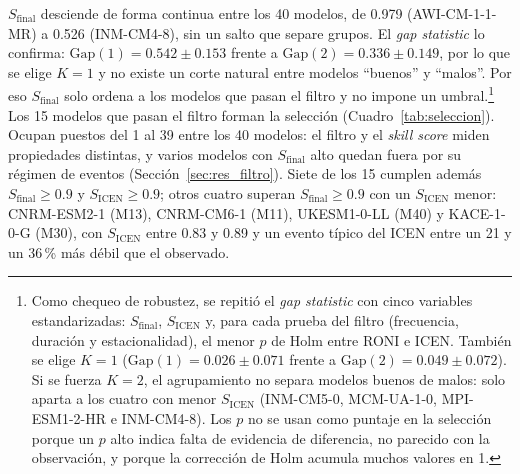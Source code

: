 \documentclass[11pt,a4paper]{article}
\begin{document}
$S_{\mathrm{final}}$ desciende de forma continua entre los 40 modelos, de 0.979 (AWI-CM-1-1-MR) a 0.526 (INM-CM4-8), sin un salto que separe grupos. El \emph{gap statistic} lo confirma: $\mathrm{Gap}(1) = 0.542 \pm 0.153$ frente a $\mathrm{Gap}(2) = 0.336 \pm 0.149$, por lo que se elige $K=1$ y no existe un corte natural entre modelos ``buenos'' y ``malos''. Por eso $S_{\mathrm{final}}$ solo ordena a los modelos que pasan el filtro y no impone un umbral.\footnote{Como chequeo de robustez, se repitió el \emph{gap statistic} con cinco variables estandarizadas: $S_{\mathrm{final}}$, $S_{\mathrm{ICEN}}$ y, para cada prueba del filtro (frecuencia, duración y estacionalidad), el menor $p$ de Holm entre RONI e ICEN. También se elige $K=1$ ($\mathrm{Gap}(1) = 0.026 \pm 0.071$ frente a $\mathrm{Gap}(2) = 0.049 \pm 0.072$). Si se fuerza $K=2$, el agrupamiento no separa modelos buenos de malos: solo aparta a los cuatro con menor $S_{\mathrm{ICEN}}$ (INM-CM5-0, MCM-UA-1-0, MPI-ESM1-2-HR e INM-CM4-8). Los $p$ no se usan como puntaje en la selección porque un $p$ alto indica falta de evidencia de diferencia, no parecido con la observación, y porque la corrección de Holm acumula muchos valores en 1.} Los 15 modelos que pasan el filtro forman la selección (Cuadro~\ref{tab:seleccion}). Ocupan puestos del 1 al 39 entre los 40 modelos: el filtro y el \emph{skill score} miden propiedades distintas, y varios modelos con $S_{\mathrm{final}}$ alto quedan fuera por su régimen de eventos (Sección~\ref{sec:res_filtro}). Siete de los 15 cumplen además $S_{\mathrm{final}} \geq 0.9$ y $S_{\mathrm{ICEN}} \geq 0.9$; otros cuatro superan $S_{\mathrm{final}} \geq 0.9$ con un $S_{\mathrm{ICEN}}$ menor: CNRM-ESM2-1 (M13), CNRM-CM6-1 (M11), UKESM1-0-LL (M40) y KACE-1-0-G (M30), con $S_{\mathrm{ICEN}}$ entre 0.83 y 0.89 y un evento típico del ICEN entre un 21 y un 36\,\% más débil que el observado.
\end{document}
